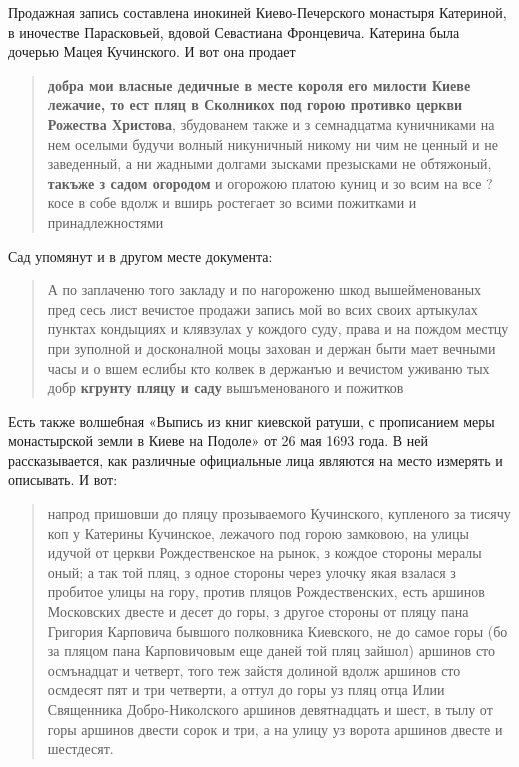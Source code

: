 Продажная запись составлена инокиней Киево-Печер\-ского монастыря Катериной, в иночестве Парасковьей, вдовой Севастиана Фронцевича. Катерина была дочерью Мацея Кучинского. И вот она продает 

\begin{quotation}
\textbf{добра мои власные дедичные в месте короля его милости Киеве лежачие, то ест пляц в Сколникох под горою противко цер\-кви Рожества Христова}, збудованем также и з семнадцатма куничниками на нем оселыми будучи волный никуничный никому ни чим не ценный и не заведенный, а ни жадными долгами зысками презысками не обтяжоный, \textbf{такъже з садом огородом} и огорожою платою куниц и зо всим на все ?косе в собе вдолж и вширь ростегает зо всими пожитками и принадлежностями \end{quotation}

Сад упомянут и в другом месте документа:

\begin{quotation}
А по заплаченю того закладу и по нагороженю шкод вышейменованых пред сесь лист вечистое продажи запись мой во всих своих артыкулах пунктах кондыциях и клявзулах у кождого суду, права и на пождом местцу при зуполной и досконалной моцы захован и держан быти мает вечными часы и о вшем еслибы кто колвек в держанъю и вечистом уживаню тых добр \textbf{кгрунту пляцу и саду} вышъменованого и пожитков
\end{quotation}

Есть также волшебная «Выпись из книг киевской ратуши, с прописанием меры монастырской земли в Киеве на Подоле»\cite{muhin01} от 26 мая 1693 года. В ней рассказывается, как различные официальные лица являются на место измерять и описывать. И вот:

\begin{quotation}
напрод пришовши до пляцу прозываемого Кучинского, купленого за тисячу коп у Катерины Кучинское, лежачого под горою замковою, на улицы идучой от церкви Рождественское на рынок, з кождое стороны мералы оный; а так той пляц, з одное стороны через улочку якая взалася з пробитое улицы на гору, против пляцов Рождественских, есть аршинов Московских двесте и десет до горы, з другое стороны от пляцу пана Григория Карповича бывшого полковника Киевского, не до самое горы (бо за пляцом пана Карповичовым еще даней той пляц зайшол) аршинов сто осмънадцат и четверт, того теж зайстя долиной вдолж аршинов сто осмдесят пят и три четверти, а оттул до горы уз пляц отца Илии Священника Добро-Николского аршинов девятнадцать и шест, в тылу от горы аршинов двести сорок и три, а на улицу уз ворота аршинов двесте и шестдесят.
\end{quotation}

